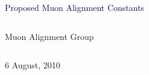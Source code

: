 \documentclass[compress]{beamer}
\begin{document}
\begin{frame}
\vfill
\begin{center}
\textcolor{darkblue}{\Large Proposed Muon Alignment Constants}

\vfill
\begin{columns}
\begin{center}
\large
Muon Alignment Group
\end{center}
\end{columns}

\vfill
 6 August, 2010

\end{center}
\end{frame}


\small


\end{document}
